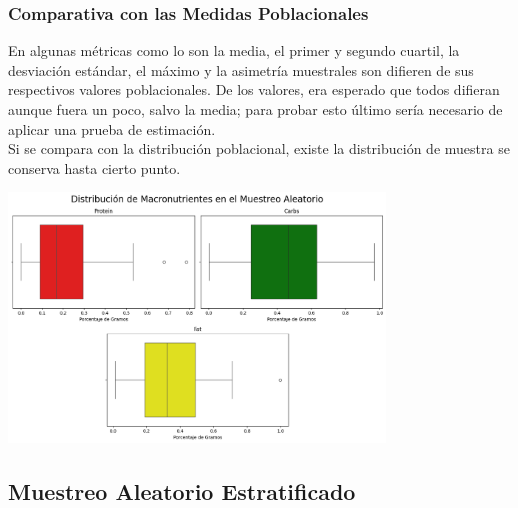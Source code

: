 \documentclass[12pt,a4paper]{article}
\begin{document}
    \subsubsection{Comparativa con las Medidas Poblacionales}
        En algunas métricas como lo son la media, el primer y segundo cuartil, 
        la desviación estándar, el máximo y la asimetría muestrales son 
        difieren de sus respectivos valores poblacionales. De los valores, era 
        esperado que todos difieran aunque fuera un poco, salvo la media; para 
        probar esto último sería necesario de aplicar una prueba de estimación.\\
        Si se compara con la distribución poblacional, existe la distribución de 
        muestra se conserva hasta cierto punto.
        \begin{center}
            \includegraphics[width=0.75\textwidth]{Resources/3_01_plot_01.png}
        \end{center}
    
    \subsection{Muestreo Aleatorio Estratificado}
\end{document}
